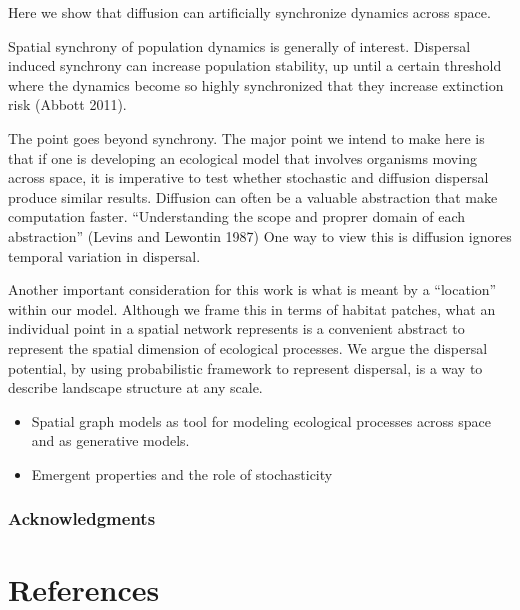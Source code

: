 \documentclass[11pt]{article}
\begin{document}
Here we show that diffusion can artificially synchronize dynamics across
space.

Spatial synchrony of population dynamics is generally of interest.
Dispersal induced synchrony can increase population stability, up until
a certain threshold where the dynamics become so highly synchronized
that they increase extinction risk (Abbott 2011).

The point goes beyond synchrony. The major point we intend to make here
is that if one is developing an ecological model that involves organisms
moving across space, it is imperative to test whether stochastic and
diffusion dispersal produce similar results. Diffusion can often be a
valuable abstraction that make computation faster. ``Understanding the
scope and proprer domain of each abstraction'' (Levins and Lewontin
1987) One way to view this is diffusion ignores temporal variation in
dispersal.

Another important consideration for this work is what is meant by a
``location'' within our model. Although we frame this in terms of
habitat patches, what an individual point in a spatial network
represents is a convenient abstract to represent the spatial dimension
of ecological processes. We argue the dispersal potential, by using
probabilistic framework to represent dispersal, is a way to describe
landscape structure at any scale.

\begin{itemize}
\tightlist
\item
  Spatial graph models as tool for modeling ecological processes across
  space and as generative models.
\item
  Emergent properties and the role of stochasticity
\end{itemize}

\hypertarget{acknowledgments}{%
\subsubsection{Acknowledgments}\label{acknowledgments}}

\hypertarget{references}{%
\section*{References}\label{references}}
\end{document}
